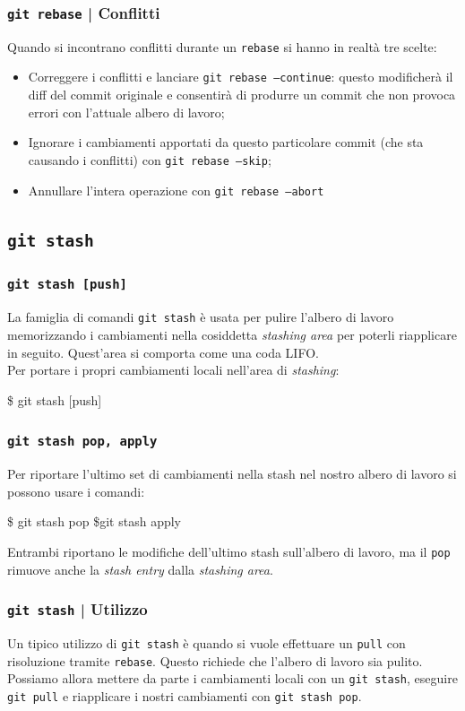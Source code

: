 \documentclass{beamer}
\begin{document}
\begin{frame}
  \label{conflict-end}
  \frametitle{\texttt{git rebase} | Conflitti}
  Quando si incontrano conflitti durante un \texttt{rebase} si hanno in
  realt\`a tre scelte:
  \begin{itemize}
    \item<1-> Correggere i conflitti e lanciare \texttt{git rebase --continue}: questo
      modificher\`a il diff del commit originale e consentir\`a di produrre un
      commit che non provoca errori con l'attuale albero di lavoro;
    \item<2-> Ignorare i cambiamenti apportati da questo particolare commit (che
      sta causando i conflitti) con \texttt{git rebase --skip};
    \item<3-> Annullare l'intera operazione con \texttt{git rebase --abort}
  \end{itemize}
\end{frame}

\subsection{\texttt{git stash}}
\begin{frame}
  \frametitle{\texttt{git stash [push]}}
  La famiglia di comandi \texttt{git stash} \`e usata per pulire l'albero di
  lavoro memorizzando i cambiamenti nella cosiddetta \emph{stashing area} per
  poterli riapplicare in seguito. Quest'area si comporta come una coda LIFO. \\
  Per portare i propri cambiamenti locali nell'area di \emph{stashing}:
  \begin{semiverbatim}
  \$ git stash [push]
  \end{semiverbatim}
\end{frame}

\begin{frame}
  \frametitle{\texttt{git stash pop, apply}}
  Per riportare l'ultimo set di cambiamenti nella stash nel nostro albero di
  lavoro si possono usare i comandi:
  \begin{semiverbatim}
  \$ git stash pop  \$git stash apply
  \end{semiverbatim}
  Entrambi riportano le modifiche dell'ultimo stash sull'albero di lavoro, ma il
  \texttt{pop} rimuove anche la \emph{stash entry} dalla \emph{stashing area}.
\end{frame}

\begin{frame}
  \frametitle{\texttt{git stash} | Utilizzo}
  Un tipico utilizzo di \texttt{git stash} \`e quando si vuole effettuare un
  \texttt{pull} con risoluzione tramite \texttt{rebase}. Questo richiede che
  l'albero di lavoro sia pulito. Possiamo allora mettere da parte i cambiamenti
  locali con un \texttt{git stash}, eseguire \texttt{git pull} e riapplicare i
  nostri cambiamenti con \texttt{git stash pop}.
\end{frame}
\end{document}
